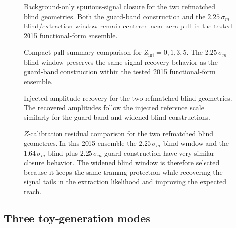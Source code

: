 \begin{figure}[h!]
\centering
{}
\caption{Background-only spurious-signal closure for the two refmatched blind
geometries. Both the guard-band construction and the $2.25\,\sigma_m$ blind/extraction window remain centered near zero pull in the tested 2015 functional-form ensemble.}
\label{fig:refmatched-blind-geometry-background}
\end{figure}

\begin{figure}[h!]
\centering
{}
\caption{Compact pull-summary comparison for $Z_{\mathrm{inj}}=0,1,3,5$. The
$2.25\,\sigma_m$ blind window preserves the same signal-recovery behavior as the guard-band construction within the tested 2015 functional-form ensemble.}
\label{fig:refmatched-blind-geometry-pulls}
\end{figure}

\begin{figure}[h!]
\centering
{}
\caption{Injected-amplitude recovery for the two refmatched blind geometries. The recovered amplitudes follow the injected reference scale similarly for the guard-band and widened-blind constructions.}
\label{fig:refmatched-blind-geometry-recovery}
\end{figure}

\begin{figure}[h!]
\centering
{}
\caption{$Z$-calibration residual comparison for the two refmatched blind geometries. In this 2015 ensemble the $2.25\,\sigma_m$ blind window and the $1.64\,\sigma_m$ blind plus $2.25\,\sigma_m$ guard construction have very similar closure behavior. The widened blind window is therefore selected because it keeps the same training protection while recovering the signal tails in the extraction likelihood and improving the expected reach.}
\label{fig:refmatched-blind-geometry-deltaz}
\end{figure}

\FloatBarrier

\subsection{Three toy-generation modes}

